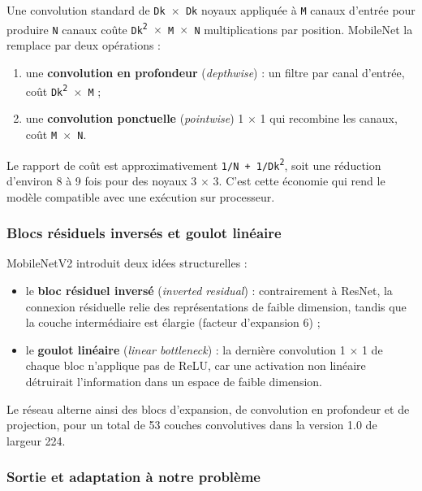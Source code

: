 \documentclass[10pt,a4paper]{article}
\begin{document}
Une convolution standard de \texttt{Dk $\times$ Dk} noyaux appliquée à \texttt{M} canaux d'entrée pour produire \texttt{N} canaux coûte \texttt{Dk\textsuperscript{2} $\times$ M $\times$ N} multiplications par position. MobileNet la remplace par deux opérations :

\begin{enumerate}
\item une \textbf{convolution en profondeur} (\emph{depthwise}) : un filtre par canal d'entrée, coût \texttt{Dk\textsuperscript{2} $\times$ M} ;
\item une \textbf{convolution ponctuelle} (\emph{pointwise}) 1 $\times$ 1 qui recombine les canaux, coût \texttt{M $\times$ N}.
\end{enumerate}

Le rapport de coût est approximativement \texttt{1/\allowbreak{}N + 1/\allowbreak{}Dk\textsuperscript{2}}, soit une réduction d'environ 8 à 9 fois pour des noyaux 3 $\times$ 3. C'est cette économie qui rend le modèle compatible avec une exécution sur processeur.

\subsubsection{Blocs résiduels inversés et goulot linéaire}

MobileNetV2 introduit deux idées structurelles :

\begin{itemize}
\item le \textbf{bloc résiduel inversé} (\emph{inverted residual}) : contrairement à ResNet, la connexion résiduelle relie des représentations de faible dimension, tandis que la couche intermédiaire est élargie (facteur d'expansion 6) ;
\item le \textbf{goulot linéaire} (\emph{linear bottleneck}) : la dernière convolution 1 $\times$ 1 de chaque bloc n'applique pas de ReLU, car une activation non linéaire détruirait l'information dans un espace de faible dimension.
\end{itemize}

Le réseau alterne ainsi des blocs d'expansion, de convolution en profondeur et de projection, pour un total de 53 couches convolutives dans la version 1.0 de largeur 224.

\subsubsection{Sortie et adaptation à notre problème}
\end{document}
